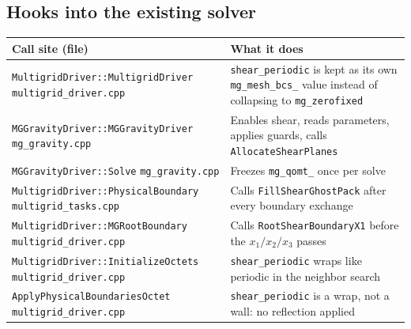 \documentclass[11pt]{article}
\newcommand{\code}[1]{\texttt{#1}}
\newcommand{\file}[1]{\texttt{\small #1}}
\newcommand{\fn}[1]{\texttt{\small #1}}
\begin{document}
\subsection{Hooks into the existing solver}
\label{sec:hooks}

\begin{center}
\small
\begin{tabular}{@{}>{\raggedright\arraybackslash}p{7.1cm}p{7.4cm}@{}}
\toprule
Call site (file) & What it does \\
\midrule
\fn{MultigridDriver::MultigridDriver}\newline
\hspace*{1em}\file{multigrid\_driver.cpp} &
\code{shear\_periodic} is kept as its own \code{mg\_mesh\_bcs\_} value instead of
collapsing to \code{mg\_zerofixed} \\[2pt]
\fn{MGGravityDriver::MGGravityDriver}\newline
\hspace*{1em}\file{mg\_gravity.cpp} &
Enables shear, reads parameters, applies guards, calls \fn{AllocateShearPlanes} \\[2pt]
\fn{MGGravityDriver::Solve}\newline
\hspace*{1em}\file{mg\_gravity.cpp} & Freezes \code{mg\_qomt\_} once per solve \\[2pt]
\fn{MultigridDriver::PhysicalBoundary}\newline
\hspace*{1em}\file{multigrid\_tasks.cpp} &
Calls \fn{FillShearGhostPack} after every boundary exchange \\[2pt]
\fn{MultigridDriver::MGRootBoundary}\newline
\hspace*{1em}\file{multigrid\_driver.cpp} &
Calls \fn{RootShearBoundaryX1} before the $x_1/x_2/x_3$ passes \\[2pt]
\fn{MultigridDriver::InitializeOctets}\newline
\hspace*{1em}\file{multigrid\_driver.cpp} &
\code{shear\_periodic} wraps like periodic in the neighbor search \\[2pt]
\fn{ApplyPhysicalBoundariesOctet}\newline
\hspace*{1em}\file{multigrid\_driver.cpp} &
\code{shear\_periodic} is a wrap, not a wall: no reflection applied \\
\bottomrule
\end{tabular}
\end{center}
\end{document}
